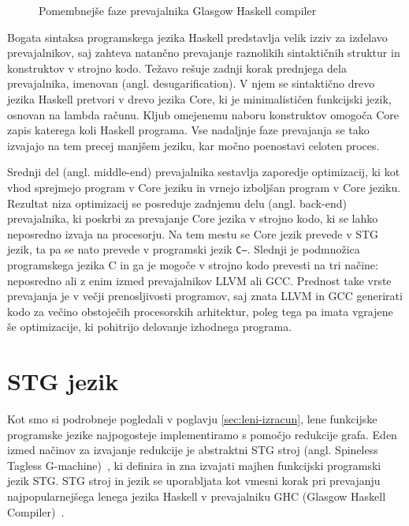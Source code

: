 \begin{figure}[h]
	\caption{Pomembnejše faze prevajalnika Glasgow Haskell compiler}
	\label{fig:shema-ghc}
\end{figure}

Bogata sintaksa programskega jezika Haskell predstavlja velik izziv za izdelavo prevajalnikov, saj zahteva natančno prevajanje raznolikih sintaktičnih struktur in konstruktov v strojno kodo. Težavo rešuje zadnji korak prednjega dela prevajalnika, imenovan  (angl. desugarification). V njem se sintaktično drevo jezika Haskell pretvori v drevo jezika Core, ki je minimalističen funkcijski jezik, osnovan na lambda računu. Kljub omejenemu naboru konstruktov omogoča Core zapis katerega koli Haskell programa. Vse nadaljnje faze prevajanja se tako izvajajo na tem precej manjšem jeziku, kar močno poenostavi celoten proces.

Srednji del (angl. middle-end) prevajalnika sestavlja zaporedje optimizacij, ki kot vhod sprejmejo program v Core jeziku in vrnejo izboljšan program v Core jeziku. Rezultat niza optimizacij se posreduje zadnjemu delu (angl. back-end) prevajalnika, ki poskrbi za prevajanje Core jezika v strojno kodo, ki se lahko neposredno izvaja na procesorju. Na tem mestu se Core jezik prevede v STG jezik, ta pa se nato prevede v programski jezik \texttt{C--}. Slednji je podmnožica programskega jezika C in ga je mogoče v strojno kodo prevesti na tri načine: neposredno ali z enim izmed prevajalnikov LLVM ali GCC. Prednost take vrste prevajanja je v večji prenosljivosti programov, saj znata LLVM in GCC generirati kodo za večino obstoječih procesorskih arhitektur, poleg tega pa imata vgrajene še optimizacije, ki pohitrijo delovanje izhodnega programa.

\section{STG jezik}
\label{sec:stg-jezik}

Kot smo si podrobneje pogledali v poglavju \ref{sec:leni-izracun}, lene funkcijske programske jezike najpogosteje implementiramo s pomočjo redukcije grafa. Eden izmed načinov za izvajanje redukcije je abstraktni STG stroj (angl. Spineless Tagless G-machine)~\cite{jones1992implementing, marlow2004making}, ki definira in zna izvajati majhen funkcijski programski jezik STG. STG stroj in jezik se uporabljata kot vmesni korak pri prevajanju najpopularnejšega lenega jezika Haskell v prevajalniku GHC (Glasgow Haskell Compiler)~\cite{GHC}.

